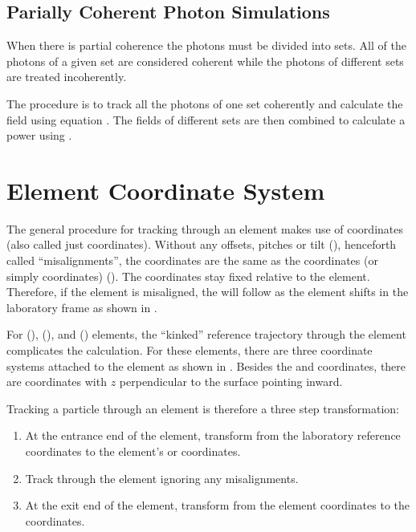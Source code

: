 \subsection{Parially Coherent Photon Simulations}

When there is partial coherence the photons must be divided into
sets. All of the photons of a given set are considered coherent while
the photons of different sets are treated incoherently.

The procedure is to track all the photons of one set coherently and
calculate the field using equation . The fields of
different sets are then combined to calculate a power using
.

\section{Element Coordinate System}
\label{s:photon.ele.coords}

The general procedure for tracking through an element makes use of
 coordinates (also called just 
coordinates). Without any offsets, pitches or tilt (), henceforth
called ``misalignments'', the  coordinates are the same
as the  coordinates (or simply 
coordinates) (). The  coordinates stay fixed
relative to the element. Therefore, if the element is misaligned, the
 will follow as the element shifts in the
laboratory frame as shown in .

For  (),  (),
and  () elements, the
``kinked'' reference trajectory through the element complicates the
calculation. For these elements, there are three coordinate systems
attached to the element as shown in . Besides
the  and  coordinates, there are
 coordinates with $z$ perpendicular to the surface
pointing inward.

Tracking a particle through an element is therefore a three
step transformation:
\begin{enumerate}
\item
At the entrance end of the element, transform from the laboratory
reference coordinates to the element's  or 
coordinates.
\item
Track through the element ignoring any misalignments.
\item
At the exit end of the element, transform from the element coordinates
to the   coordinates.
\end{enumerate}


